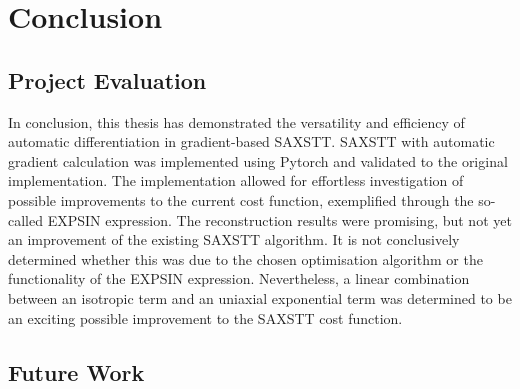 \chapter{Conclusion}

\section{Project Evaluation}

In conclusion, this thesis has demonstrated the versatility and efficiency of automatic differentiation in gradient-based SAXSTT.
SAXSTT with automatic gradient calculation was implemented using Pytorch and validated to the original implementation.
The implementation allowed for effortless investigation of possible improvements to the current cost function, exemplified through the so-called EXPSIN expression.
The reconstruction results were promising, but not yet an improvement of the existing SAXSTT algorithm.
It is not conclusively determined whether this was due to the chosen optimisation algorithm or the functionality of the EXPSIN expression.
Nevertheless, a linear combination between an isotropic term and an uniaxial exponential term was determined to be an exciting possible improvement to the SAXSTT cost function.




\section{Future Work}

